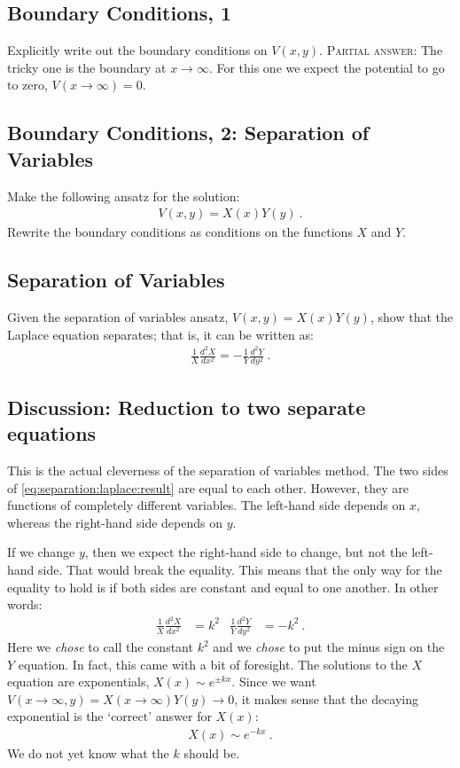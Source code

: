 \documentclass[12pt]{article}
\numberwithin{equation}{section}    %
\begin{document}
\subsection{Boundary Conditions, 1}

Explicitly write out the boundary conditions on $V(x,y)$. \textsc{Partial answer:} The tricky one is the boundary at $x\to \infty$. For this one we expect the potential to go to zero, $V(x\to \infty) = 0$. 


\subsection{Boundary Conditions, 2: Separation of Variables}

Make the following ansatz for the solution:
\begin{align}
	V(x,y) = X(x) Y(y) \ .
\end{align}
Rewrite the boundary conditions as conditions on the functions $X$ and $Y$.

\subsection{Separation of Variables}
Given the separation of variables ansatz, $V(x,y)=X(x)Y(y)$, show that the Laplace equation separates; that is, it can be written as:
\begin{align}
	\frac{1}{X}\frac{d^2X}{dx^2}
	= -
	\frac{1}{Y}\frac{d^2Y}{dy^2} \ .
	\label{eq:separation:laplace:result}
\end{align}


\subsection*{Discussion: Reduction to two separate equations}

This is the actual cleverness of the separation of variables method. The two sides of \eqref{eq:separation:laplace:result} are equal to each other. However, they are functions of completely different variables. The left-hand side depends on $x$, whereas the right-hand side depends on $y$. 

If we change $y$, then we expect the right-hand side to change, but not the left-hand side. That would break the equality. This means that the only way for the equality to hold is if both sides are constant and equal to one another. In other words:
\begin{align}
	\frac{1}{X}\frac{d^2X}{dx^2}
	&=
	k^2
	&
	\frac{1}{Y}\frac{d^2Y}{dy^2} 
	&= - k^2 \ .
	\label{eq:laplace:k2}
\end{align}
Here we \emph{chose} to call the constant $k^2$ and we \emph{chose} to put the minus sign on the $Y$ equation. In fact, this came with a bit of foresight. The solutions to the $X$ equation are exponentials, $X(x)\sim e^{\pm k x}$. Since we want $V(x\to \infty,y)=X(x\to\infty)Y(y) \to 0$, it makes sense that the decaying exponential is the `correct' answer for $X(x)$:
\begin{align}
	X(x) \sim e^{-kx} \ .
\end{align}
We do not yet know what the $k$ should be.
\end{document}
